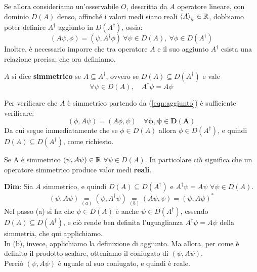 \documentclass[FisicaTeorica.tex]{subfiles}
\begin{document}
\begin{enumerate}
\[	\]
	Se allora consideriamo un'osservabile $O$, descritta da $A$ operatore lineare, con dominio $D(A)$ denso, affinché i valori medi siano reali $\left\langle A\right\rangle_\psi\in\mathbb{R}$, dobbiamo poter definire $A^\dag$ aggiunto in $D(A^\dag)$, ossia:
\begin{equation}
\left(A\psi,\phi\right)=\left(\psi,A^\dag\phi\right)\> \forall \psi \in D\left(A\right), \> \forall \phi \in D\left(A^\dag\right)
\label{eqn:aggiunto}
\end{equation}
Inoltre, è necessario imporre che tra operatore $A$ e il suo aggiunto $A^\dag$ esista una relazione precisa, che ora definiamo.
\begin{dfn}
$A$ si dice \textbf{simmetrico} se $A \subseteq A^\dag$, ovvero se $D(A) \subseteq D\left(A^\dag\right)$ e vale
\[ 
\forall \psi \in D\left(A\right), \quad A^\dag \psi =A \psi
\]
\end{dfn}
Per verificare che $A$ è simmetrico partendo da (\ref{eqn:aggiunto}) è sufficiente verificare:
\[ 
\left(\phi,A\psi\right)=\left(A\phi,\psi\right)\quad \bm{\forall \phi, \psi \in D\left(A\right)}
\]
Da cui segue immediatamente che se $\phi \in D\left(A\right)$ allora $\phi \in D\left(A^\dag\right)$, e quindi $D(A)\subseteq D(A^\dag)$, come richiesto.

\begin{thm}
Se A è simmetrico $\left(\psi,A\psi\right)\in \mathbb{R}$ $\forall \psi \in D\left(A\right)$. In particolare ciò significa che un operatore simmetrico produce valor medi \textbf{reali}.
\end{thm}
\textbf{Dim}: 
Sia $A$ simmetrico, e quindi $D(A) \subseteq D(A^\dag)$ e $A^\dag \psi = A\psi$ $\forall \psi \in D(A)$. 
\[
(\psi, A\psi) \underset{(a)}{=} (\psi,A^\dag \psi) \underset{(b)}{=} (A\psi, \psi) = (\psi,A\psi)^*
\]
Nel passo (a) si ha che $\psi \in D(A)$ è anche $\psi \in D(A^\dag)$, essendo $D(A)\subseteq D(A^\dag)$, e ciò rende ben definita l'uguaglianza $A^\dag \psi = A\psi$ della simmetria, che qui applichiamo.\\
In (b), invece, applichiamo la definizione di aggiunto. Ma allora, per come è definito il prodotto scalare, otteniamo il coniugato di $(\psi,A\psi)$.\\
Perciò $(\psi,A\psi)$ è uguale al suo coniugato, e quindi è reale.
\end{enumerate}











\end{document}
